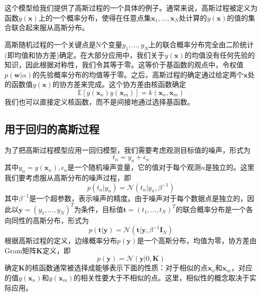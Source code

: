 这个模型给我们提供了高斯过程的一个具体的例子。通常来说，高斯过程被定义为函数$y(\boldsymbol{x})$上的一个概率分布，使得在任意点集$\boldsymbol{x}_1,\dots,\boldsymbol{x}_N$处计算的$y(\boldsymbol{x})$的值的集合联合起来服从高斯分布。

高斯随机过程的一个关键点是N个变量$y_1,\dots,y_N$上的联合概率分布完全由二阶统计(即均值和协方差)确定。在大部分应用中，我们关于$y(\boldsymbol{x})$的均值没有任何先验的知识，因此根据对称性，我们令其等于零。这等价于基函数的观点中，令权值$p(\boldsymbol{w}|\alpha)$的先验概率分布的均值等于零。之后，高斯过程的确定通过给定两个$\boldsymbol{x}$处的函数值$y(\boldsymbol{x})$的协方差来完成。这个协方差由核函数确定 
\begin{equation}
	\mathbb{E}[y(\boldsymbol{x}_n)y(\boldsymbol{x}_m)]=k(\boldsymbol{x}_n,\boldsymbol{x}_m)
\end{equation}
我们也可以直接定义核函数，而不是间接地通过选择基函数。
\subsection*{用于回归的高斯过程}
为了把高斯过程模型应用一回归模型，我们需要考虑观测目标值的噪声，形式为
\begin{equation}
	t_n=y_n+\epsilon_n
\end{equation}
其中$y_n=y(\boldsymbol{x}_n),\epsilon_n$是一个随机噪声变量，它的值对于每个观测$n$是独立的。这里我们要考虑服从高斯分布的噪声过程，即
\begin{equation}
	p(t_n|y_n)=\mathcal{N}(t_n|y_n,\beta^{-1})
\end{equation}
其中$\beta^{-1}$是一个超参数，表示噪声的精度。由于噪声对于每个数据点是独立的，因此以$\boldsymbol{y}=(y_1,\dots,y_N)^T$为条件，目标值$\boldsymbol{t}=(t_1,\dots,t_N)^T$的联合概率分布是一个各向同性的高斯分布，形式为
\begin{equation}
	p(\boldsymbol{t}|\boldsymbol{y})=\mathcal{N}(\boldsymbol{t}|\boldsymbol{y},\beta^{-1}\boldsymbol{I}_N)
\end{equation}
根据高斯过程的定义，边缘概率分布$p(\boldsymbol{y})$是一个高斯分布，均值为零，协方差由Gram矩阵$\boldsymbol{K}$定义，即
\begin{equation}
	p(\boldsymbol{y})=\mathcal{N}(\boldsymbol{y}|0,\boldsymbol{K})
\end{equation}
确定$\boldsymbol{K}$的核函数通常被选择成能够表示下面的性质：对于相似的点$\boldsymbol{x}_n$和$\boldsymbol{x}_m$，对应的值$y(\boldsymbol{x}_n)$和$y(\boldsymbol{x}_m)$的相关性要大于不相似的点。这里，相似性的概念取决于实际应用。

